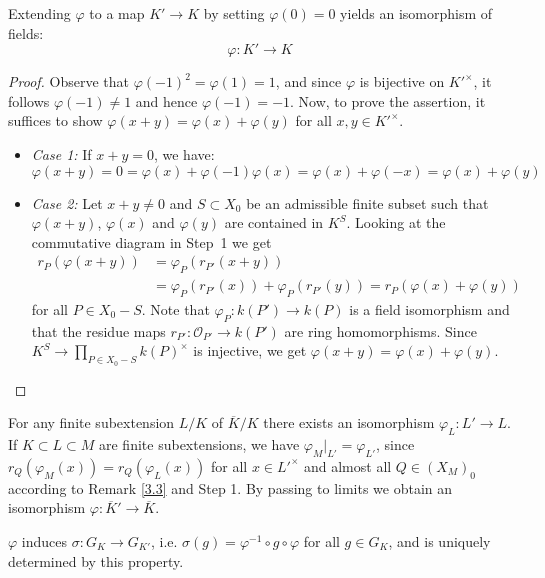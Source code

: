\begin{step}
Extending $\varphi$ to a map $K'\to K$ by setting $\varphi(0)=0$ yields an isomorphism of fields: 
\[\varphi:K'\to K\]
\end{step}

\begin{proof}
Observe that $\varphi(-1)^2 = \varphi(1) = 1$, and since $\varphi$ is bijective on $K'^\times$, it follows $\varphi(-1) \neq 1$ and hence $\varphi(-1) = -1$. Now, to prove the assertion, it suffices to show $\varphi(x + y) = \varphi(x) + \varphi(y)$ for all $x,y\in K'^\times$.
\begin{itemize}
\item \textit{Case 1:} If $x + y = 0$, we have:
\[ \varphi(x + y) = 0 = \varphi(x) + \varphi(-1)\varphi(x) = \varphi(x) + \varphi(-x) = \varphi(x) + \varphi(y) \]
\item \textit{Case 2:} Let $x + y\neq 0$ and $S\subset X_0$ be an admissible finite subset such that $\varphi(x + y)$, $\varphi(x)$ and $\varphi(y)$ are contained in $K^S$. Looking at the commutative diagram in \mbox{Step 1} we get
\begin{align*}
r_P(\varphi(x+ y)) &= \varphi_P(r_{P'}(x + y)) \\
&= \varphi_P(r_{P'}(x)) + \varphi_P(r_{P'}(y)) = r_P(\varphi(x) + \varphi(y))
\end{align*}
for all $P\in X_0 -  S$. Note that $\varphi_P: k(P')\to k(P)$ is a field isomorphism and that the residue maps $r_{P'}: \mathcal{O}_{P'} \to k(P')$ are ring homomorphisms. Since $K^S\to \prod_{P\in X_0 -  S} k(P)^\times$ is injective, we get $\varphi(x+y) = \varphi(x) + \varphi(y)$.\qedhere
\end{itemize}
\end{proof}

\begin{remark}
For any finite subextension $L/K$ of $\overline{K}/K$ there exists an isomorphism $\varphi_L: L'\to L$. If $K\subset L\subset M$ are finite subextensions, we have $\varphi_M|_{L'} = \varphi_{L'}$, since $r_Q(\varphi_M(x)) = r_Q(\varphi_L(x))$ for all $x\in L'^\times$ and almost all $Q\in (X_M)_0$ according to Remark \ref{3.3} and Step 1. By passing to limits we obtain an isomorphism $\varphi: \overline{K}'\to \overline{K}$.
\end{remark}

\begin{step}
$\varphi$ induces $\sigma:G_K\to G_{K'}$, i.e. $\sigma(g) = \varphi^{-1}\circ g\circ \varphi$ for all $g\in G_K$, and is uniquely determined by this property.
\end{step}

